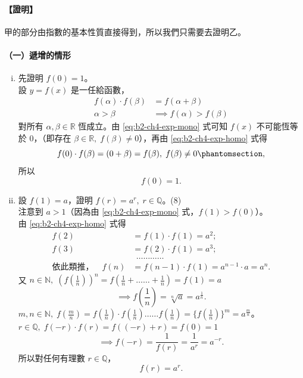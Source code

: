 \paragraph{【證明】} 甲的部分由指數的基本性質直接得到，所以我們只需要去證明乙。

\paragraph{（一）遞增的情形}
\begin{enumerate}[(i)]
    \item 先證明 $f(0) = 1$。\\
    設 $y = f(x)$ 是一任給函數，
    \begin{align}
    f(\alpha)\cdot f(\beta) &= f(\alpha+\beta) \tag{6}\label{eq:b2-ch4-exp-homo} \\
    \alpha > \beta &\implies f(\alpha) > f(\beta) \tag{7}\label{eq:b2-ch4-exp-mono}
    \end{align}
    對所有 $\alpha, \beta \in \mathbb{R}$ 恆成立。由 \eqref{eq:b2-ch4-exp-mono} 式可知 $f(x)$ 不可能恆等於 0，（即存在 $\beta \in \mathbb{R},\; f(\beta) \neq 0$），再由 \eqref{eq:b2-ch4-exp-homo} 式得
    \[
    f(0)\cdot f(\beta) = (0+\beta) = f(\beta),\; f(\beta) \neq 0\phantomsection\label{note:b2-ch4-p92-missing-f},
    \]
    所以
    \[
    f(0) = 1.
    \]
    \item 設 $f(1) = a$，證明 $f(r) = a^r,\; r \in \mathbb{Q}$。\hfill (8) \\
    注意到 $a > 1$（因為由 \eqref{eq:b2-ch4-exp-mono} 式，$f(1) > f(0)$）。\\
    由 \eqref{eq:b2-ch4-exp-homo} 式得
    \begin{align*}
    f(2) &= f(1)\cdot f(1) = a^2; \\
    f(3) &= f(2)\cdot f(1) = a^3; \\
    &\ \ \dots\dots\dots\dots \\
    \text{依此類推，} \quad f(n) &= f(n-1)\cdot f(1) = a^{n-1}\cdot a = a^n.
    \end{align*}
    又 $n \in \mathbb{N},\; (f(\frac{1}{n}))^n = f(\frac{1}{n} + \dots\dots + \frac{1}{n}) = f(1) = a$
    \[
    \implies f\left(\frac{1}{n}\right) = \sqrt[n]{a} = a^{\frac{1}{n}}.
    \]
    $m, n \in \mathbb{N},\; f(\frac{m}{n}) = f(\frac{1}{n})\cdot f(\frac{1}{n})\dots\dots f(\frac{1}{n}) = \{f(\frac{1}{n})\}^m = a^{\frac{m}{n}}$。\\
    $r \in \mathbb{Q},\; f(-r)\cdot f(r) = f((-r)+r) = f(0) = 1$
    \[
    \implies f(-r) = \frac{1}{f(r)} = \frac{1}{a^r} = a^{-r}.
    \]
    所以對任何有理數 $r \in \mathbb{Q}$，
    \begin{equation}\tag{9}
    f(r) = a^r. \label{eq:b2-ch4-f-r-eq-ar}
    \end{equation}
\end{enumerate}

